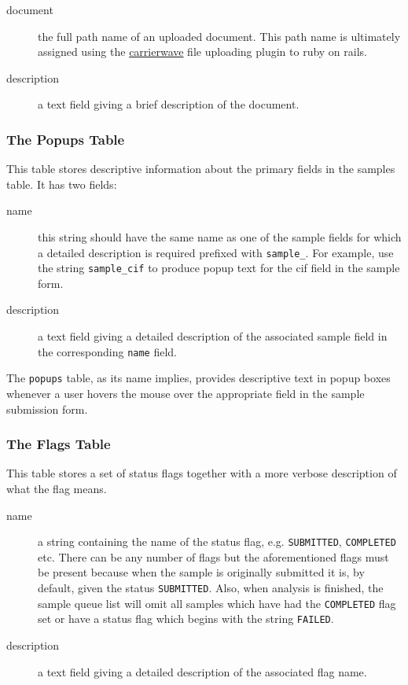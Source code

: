 \documentclass[12pt,twoside]{article}
\begin{document}
\begin{description}
\item[document]
the full path name of an uploaded document. This path name is ultimately
assigned using the 
\href{https://github.com/jnicklas/carrierwave}{carrierwave}
file uploading plugin to ruby on rails.
\item[description]
a text field giving a brief description of the document.
\end{description}

\subsubsection{The Popups Table}
This table stores descriptive information about the primary fields
in the samples table. It has two fields:

\begin{description}
\item[name]
this string should have the same name as one of the sample fields for
which a detailed description is required prefixed with \verb=sample_=.
For example, use the string \verb=sample_cif= to produce popup text
for the cif field in the sample form.
\item[description]
a text field giving a detailed description of the associated sample field
in the corresponding \verb=name= field.
\end{description}

The \verb=popups= table, as its name implies, provides descriptive
text in popup boxes whenever a user hovers the mouse over the
appropriate field in the sample submission form.

\subsubsection{The Flags Table}
This table stores a set of status flags together with a more verbose
description of what the flag means. 

\begin{description}
\item[name]
a string containing the name of the status flag, e.g. 
\verb=SUBMITTED=, \verb=COMPLETED= etc. There can be any number of flags
but the aforementioned flags must be present because when the sample is
originally submitted it is, by default, given the status
\verb=SUBMITTED=. Also, when analysis is finished, the sample queue list
will omit all samples which have had the \verb=COMPLETED= flag set
or have a status flag which begins with the string \verb=FAILED=.
\item[description]
a text field giving a detailed description of the associated flag name.
\end{description}
\end{document}
